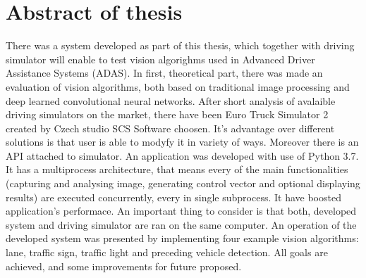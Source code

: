 \section*{Abstract of thesis}
There was a system developed as part of this thesis, which together with driving simulator will enable to test vision algorighms used in Advanced Driver Assistance Systems (ADAS).
In first, theoretical part, there was made an evaluation of vision algorithms, both based on traditional image processing and deep learned convolutional neural networks.
After short analysis of avalaible driving simulators on the market, there have been Euro Truck Simulator 2 created by Czech studio SCS Software choosen.
It's advantage over different solutions is that user is able to modyfy it in variety of ways. Moreover there is an API attached to simulator.
An application was developed with use of Python 3.7.
It has a multiprocess architecture, that means every of the main functionalities (capturing and analysing image, generating control vector and optional displaying results) are executed concurrently, every in single subprocess.
It have boosted application's performace. An important thing to consider is that both, developed system and driving simulator are ran on the same computer.
An operation of the developed system was presented by implementing four example vision algorithms: lane, traffic sign, traffic light and preceding vehicle detection. 
All goals are achieved, and some improvements for future proposed.